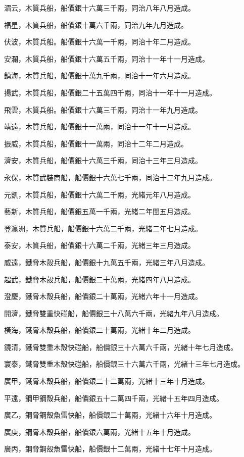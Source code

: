 \begin{pinyinscope}
湄云，木質兵船，船價銀十六萬三千兩，同治八年八月造成。

福星，木質兵船，船價銀十萬六千兩，同治九年九月造成。

伏波，木質兵船。船價銀十六萬一千兩，同治十年二月造成。

安瀾，木質兵船，船價銀十六萬五千兩，同治十一年十一月造成。

鎮海，木質兵船，船價銀十萬九千兩，同治十一年六月造成。

揚武，木質兵船，船價銀二十五萬四千兩，同治十一年十一月造成。

飛雲，木質兵船。船價銀十六萬三千兩，同治十一年九月造成。

靖遠，木質兵船，船價銀十一萬兩，同治十一年十一月造成。

振威，木質兵船，船價銀十一萬兩，同治十二年二月造成。

濟安，木質兵船，船價銀十六萬三千兩，同治十三年三月造成。

永保，木質武裝商船，船價銀十六萬七千兩，同治十二年九月造成。

元凱，木質兵船，船價銀十六萬二千兩，光緒元年八月造成。

藝新，木質兵船，船價銀五萬一千兩，光緒二年閏五月造成。

登瀛洲，木質兵船，船價銀十六萬二千兩，光緒二年七月造成。

泰安，木質兵船，船價銀十六萬二千兩，光緒三年三月造成。

威遠，鐵脅木殼兵船，船價銀十九萬五千兩，光緒三年八月造成。

超武，鐵脅木殼兵船，船價銀二十萬兩，光緒四年八月造成。

澄慶，鐵脅木殼兵船，船價銀二十萬兩，光緒六年十一月造成。

開濟，鐵脅雙重快碰船，船價銀三十八萬六千兩，光緒九年八月造成。

橫海，鐵脅木殼兵船，船價銀二十萬兩，光緒十年二月造成。

鏡清，鐵脅雙重木殼快碰船，船價銀三十六萬六千兩，光緒十年七月造成。

寰泰，鐵脅雙重木殼快碰船，船價銀三十六萬六千兩，光緒十三年七月造成。

廣甲，鐵脅木殼兵船，船價銀二十二萬兩，光緒十三年十月造成。

平遠，鋼甲鋼殼兵船，船價銀五十二萬四千兩，光緒十五年四月造成。

廣乙，鋼脅鋼殼魚雷快船，船價銀二十萬兩，光緒十六年十月造成。

廣庚，鋼脅木殼兵船，船價銀六萬兩，光緒十五年十月造成。

廣丙，鋼脅鋼殼魚雷快船，船價銀十二萬兩，光緒十七年十月造成。


\end{pinyinscope}

